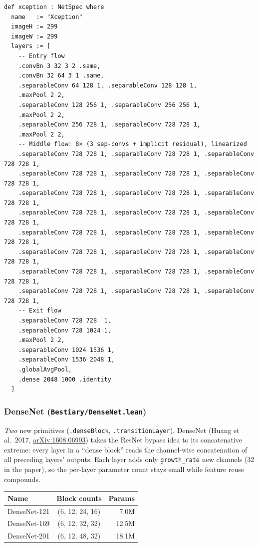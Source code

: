 \begin{verbatim}
def xception : NetSpec where
  name   := "Xception"
  imageH := 299
  imageW := 299
  layers := [
    -- Entry flow
    .convBn 3 32 3 2 .same,
    .convBn 32 64 3 1 .same,
    .separableConv 64 128 1, .separableConv 128 128 1,
    .maxPool 2 2,
    .separableConv 128 256 1, .separableConv 256 256 1,
    .maxPool 2 2,
    .separableConv 256 728 1, .separableConv 728 728 1,
    .maxPool 2 2,
    -- Middle flow: 8× (3 sep-convs + implicit residual), linearized
    .separableConv 728 728 1, .separableConv 728 728 1, .separableConv 728 728 1,
    .separableConv 728 728 1, .separableConv 728 728 1, .separableConv 728 728 1,
    .separableConv 728 728 1, .separableConv 728 728 1, .separableConv 728 728 1,
    .separableConv 728 728 1, .separableConv 728 728 1, .separableConv 728 728 1,
    .separableConv 728 728 1, .separableConv 728 728 1, .separableConv 728 728 1,
    .separableConv 728 728 1, .separableConv 728 728 1, .separableConv 728 728 1,
    .separableConv 728 728 1, .separableConv 728 728 1, .separableConv 728 728 1,
    .separableConv 728 728 1, .separableConv 728 728 1, .separableConv 728 728 1,
    -- Exit flow
    .separableConv 728 728  1,
    .separableConv 728 1024 1,
    .maxPool 2 2,
    .separableConv 1024 1536 1,
    .separableConv 1536 2048 1,
    .globalAvgPool,
    .dense 2048 1000 .identity
  ]
\end{verbatim}

\subsubsection*{DenseNet (\texttt{Bestiary/DenseNet.lean})}
\emph{Two} new primitives (\texttt{.denseBlock}, \texttt{.transitionLayer}).
DenseNet (Huang et al.\ 2017,
\href{https://arxiv.org/abs/1608.06993}{arXiv:1608.06993}) takes the
ResNet bypass idea to its concatenative extreme: every layer in a
``dense block'' reads the channel-wise concatenation of all preceding
layers' outputs. Each layer adds only \texttt{growth\_rate} new
channels (32 in the paper), so the per-layer parameter count stays
small while feature reuse compounds.

\begin{center}
\begin{tabular}{l c r}
\hline
Name          & Block counts        & Params              \\
\hline
DenseNet-121  & (6, 12, 24, 16)     &  7.0M  \\
DenseNet-169  & (6, 12, 32, 32)     & 12.5M  \\
DenseNet-201  & (6, 12, 48, 32)     & 18.1M  \\
\hline
\end{tabular}
\end{center}

